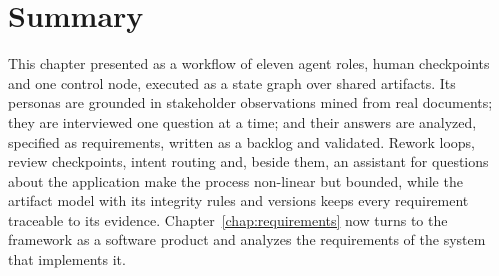 \section{Summary}
\label{sec:pa-summary}
This chapter presented \sysname{} as a workflow of eleven agent roles, human checkpoints and one control node, executed as a state graph over shared artifacts. Its personas are grounded in stakeholder observations mined from real documents; they are interviewed one question at a time; and their answers are analyzed, specified as requirements, written as a backlog and validated. Rework loops, review checkpoints, intent routing and, beside them, an assistant for questions about the application make the process non-linear but bounded, while the artifact model with its integrity rules and versions keeps every requirement traceable to its evidence. Chapter~\ref{chap:requirements} now turns to the framework as a software product and analyzes the requirements of the system that implements it.
